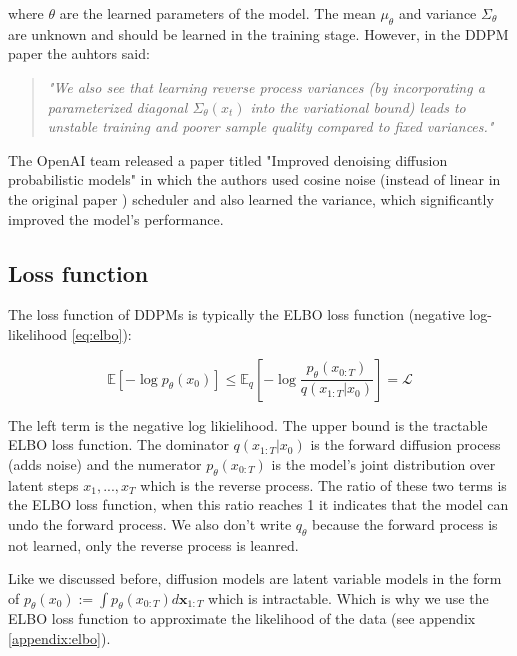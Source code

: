 where $\theta$ are the learned parameters of the model. The mean $\mu_\theta$ and variance $\Sigma_\theta$ are unknown and should be learned in the training stage. However, in the DDPM paper \cite{ddpm} the auhtors said:

\begin{quote}
    \textit{"We also see that learning reverse process variances (by incorporating a parameterized diagonal $\Sigma_\theta(x_t)$ into the variational bound) leads to unstable training and poorer sample quality compared to fixed variances."} \cite{ddpm}
\end{quote}

The OpenAI team released a paper titled "Improved denoising diffusion probabilistic models" \cite{openai_improved_ddpm} in which the authors used cosine noise (instead of linear in the original paper \cite{ddpm}) scheduler and also learned the variance, which significantly improved the model's performance.








\subsection{Loss function}

The loss function of DDPMs is typically the ELBO loss function (negative log-likelihood \ref{eq:elbo}):

\begin{equation*}
    \mathbb{E}[-\log p_\theta (x_0)] \leq \mathbb{E}_q[-\log \frac{p_\theta(x_{0:T})}{q(x_{1:T}|x_0)}] = \mathcal{L}
\end{equation*}

The left term is the negative log likielihood. The upper bound is the tractable ELBO loss function. The dominator $q(x_{1:T}|x_0)$ is the forward diffusion process (adds noise) and the numerator $p_\theta(x_{0:T})$ is the model's joint distribution over latent steps $x_1, ..., x_T$ which is the reverse process. The ratio of these two terms is the ELBO loss function, when this ratio reaches 1 it indicates that the model can undo the forward process. We also don't write $q_\theta$ because the forward process is not learned, only the reverse process is leanred.

Like we discussed before, diffusion models are latent variable models in the form of $p_\theta (x_0) := \int p_\theta(x_{0:T}) d\mathbf{x}_{1:T}$ which is intractable. Which is why we use the ELBO loss function to approximate the likelihood of the data (see appendix \ref{appendix:elbo}).






